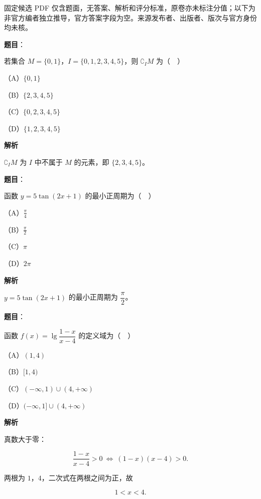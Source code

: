 

\begin{gktip}
固定候选 PDF 仅含题面，无答案、解析和评分标准，原卷亦未标注分值；以下为非官方编者独立推导，官方答案字段为空。来源发布者、出版者、版次与官方身份均未核。
\end{gktip}

\begin{answer}

\textbf{题目}：

若集合 $M=\{0,1\}$，$I=\{0,1,2,3,4,5\}$，则 $\complement_IM$ 为（　）

（A）$\{0,1\}$

（B）$\{2,3,4,5\}$

（C）$\{0,2,3,4,5\}$

（D）$\{1,2,3,4,5\}$

\textbf{解析}

$\complement_IM$ 为 $I$ 中不属于 $M$ 的元素，即 $\{2,3,4,5\}$。


\end{answer}
\begin{answer}

\textbf{题目}：

函数 $y=5\tan(2x+1)$ 的最小正周期为（　）

（A）$\frac{\pi}{4}$

（B）$\frac{\pi}{2}$

（C）$\pi$

（D）$2\pi$

\textbf{解析}

$y=5\tan(2x+1)$ 的最小正周期为 $\dfrac{\pi}{2}$。


\end{answer}
\begin{answer}

\textbf{题目}：

函数 $f(x)=\lg\dfrac{1-x}{x-4}$ 的定义域为（　）

（A）$(1,4)$

（B）$[1,4)$

（C）$(-\infty,1)\cup(4,+\infty)$

（D）$(-\infty,1]\cup(4,+\infty)$

\textbf{解析}

真数大于零：

\nopagebreak[4]
\[\frac{1-x}{x-4}>0\ \Leftrightarrow\ (1-x)(x-4)>0.\]

两根为 $1$，$4$，二次式在两根之间为正，故

\nopagebreak[4]
\[1<x<4.\]


\end{answer}
